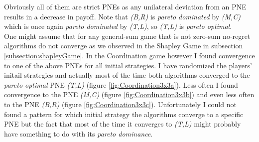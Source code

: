Obviously all of them are strict PNEs as any unilateral deviation from an PNE results in a decrease in payoff. Note that \textit{(B,R)} is \textit{pareto dominated} by \textit{(M,C)} which is once again \textit{pareto dominated} by \textit{(T,L)}, so \textit{(T,L)} is \textit{pareto optimal}. \\

One might assume that for any general-sum game that is not zero-sum no-regret algorithms do not converge as we observed in the Shapley Game in subsection \ref{subsection:shapleyGame}. In the Coordination game however I found convergence to one of the above PNEs for all initial strategies. I have randomized the players' initail strategies and actually most of the time both algorithms converged to the \textit{pareto optimal} PNE \textit{(T,L)} (figure \ref{fig:Coordination3x3a}). Less often I found convergence to the PNE \textit{(M,C)} (figure \ref{fig:Coordination3x3b}) and even less often to the PNE \textit{(B,R)} (figure \ref{fig:Coordination3x3c}). Unfortunately I could not found a pattern for which initial strategy the algorithms converge to a specific PNE but the fact that most of the time it converges to \textit{(T,L)} might probably have something to do with its \textit{pareto dominance}. 

